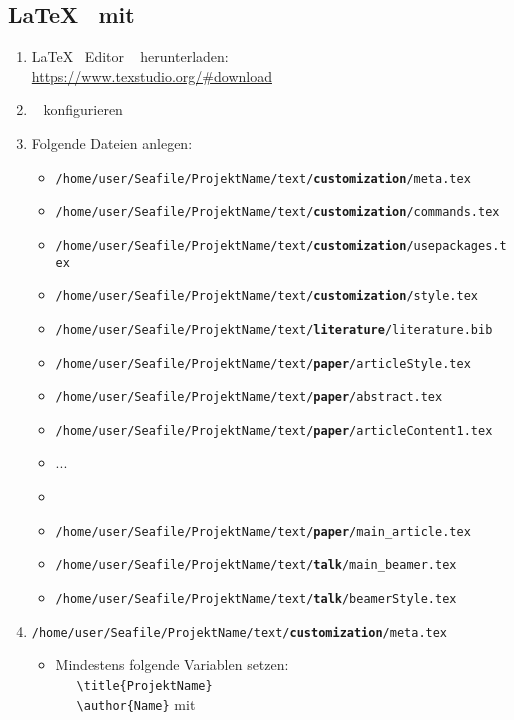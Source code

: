 \subsection{\LaTeX~ mit \texstudio}
\begin{enumerate}
	\item \LaTeX~ Editor \texstudio~ herunterladen: \\\url{https://www.texstudio.org/#download}
	\item \texstudio~ konfigurieren
	\item Folgende Dateien anlegen:
	\begin{itemize}
		\item \texttt{/home/user/Seafile/ProjektName/text/\textbf{customization}/meta.tex}
		\item \texttt{/home/user/Seafile/ProjektName/text/\textbf{customization}/commands.tex}
		\item \texttt{/home/user/Seafile/ProjektName/text/\textbf{customization}/usepackages.tex}
		\item \texttt{/home/user/Seafile/ProjektName/text/\textbf{customization}/style.tex}
		\item \texttt{/home/user/Seafile/ProjektName/text/\textbf{literature}/literature.bib}			
		\item \texttt{/home/user/Seafile/ProjektName/text/\textbf{paper}/articleStyle.tex}
		\item \texttt{/home/user/Seafile/ProjektName/text/\textbf{paper}/abstract.tex}
		\item \texttt{/home/user/Seafile/ProjektName/text/\textbf{paper}/articleContent1.tex}
		\item ...
		\item \item \texttt{/home/user/Seafile/ProjektName/text/\textbf{paper}/main\_article.tex}
		\item \texttt{/home/user/Seafile/ProjektName/text/\textbf{talk}/main\_beamer.tex}
		\item \texttt{/home/user/Seafile/ProjektName/text/\textbf{talk}/beamerStyle.tex}
	\end{itemize}
	\item \texttt{/home/user/Seafile/ProjektName/text/\textbf{customization}/meta.tex}
	\begin{itemize}
		\item Mindestens folgende Variablen setzen: \\
		~~~\texttt{\textbackslash title\{ProjektName\}}\\
		~~~\texttt{\textbackslash author\{Name\}} mit \\

\end{itemize}
\end{enumerate}
